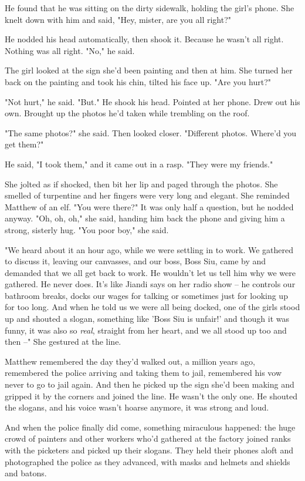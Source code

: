 He found that he was sitting on the dirty sidewalk, holding the
girl's phone. She knelt down with him and said, "Hey, mister, are
you all right?"

He nodded his head automatically, then shook it. Because he wasn't
all right. Nothing was all right. "No," he said.

The girl looked at the sign she'd been painting and then at him.
She turned her back on the painting and took his chin, tilted his
face up. "Are you hurt?"

"Not hurt," he said. "But." He shook his head. Pointed at her
phone. Drew out his own. Brought up the photos he'd taken while
trembling on the roof.

"The same photos?" she said. Then looked closer. "Different photos.
Where'd you get them?"

He said, "I took them," and it came out in a rasp. "They were my
friends."

She jolted as if shocked, then bit her lip and paged through the
photos. She smelled of turpentine and her fingers were very long
and elegant. She reminded Matthew of an elf. "You were there?" It
was only half a question, but he nodded anyway. "Oh, oh, oh," she
said, handing him back the phone and giving him a strong, sisterly
hug. "You poor boy," she said.

"We heard about it an hour ago, while we were settling in to work.
We gathered to discuss it, leaving our canvasses, and our boss,
Boss Siu, came by and demanded that we all get back to work. He
wouldn't let us tell him why we were gathered. He never does. It's
like Jiandi says on her radio show -- he controls our bathroom
breaks, docks our wages for talking or sometimes just for looking
up for too long. And when he told us we were all being docked, one
of the girls stood up and shouted a slogan, something like 'Boss
Siu is unfair!' and though it was funny, it was also so
\emph{real}, straight from her heart, and we all stood up too and
then --" She gestured at the line.

Matthew remembered the day they'd walked out, a million years ago,
remembered the police arriving and taking them to jail, remembered
his vow never to go to jail again. And then he picked up the sign
she'd been making and gripped it by the corners and joined the
line. He wasn't the only one. He shouted the slogans, and his voice
wasn't hoarse anymore, it was strong and loud.

And when the police finally did come, something miraculous
happened: the huge crowd of painters and other workers who'd
gathered at the factory joined ranks with the picketers and picked
up their slogans. They held their phones aloft and photographed the
police as they advanced, with masks and helmets and shields and
batons.

